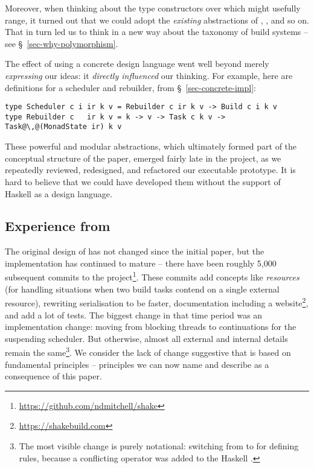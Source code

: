Moreover, when thinking about the type constructors over which  might
usefully range, it turned out that we could adopt the \emph{existing} abstractions
of , ,  and so on.
That in turn led us to think in a new way about the taxonomy
of build systems -- see \S~\ref{sec-why-polymorphism}.

The effect of using a concrete design language went well beyond
merely \emph{expressing} our ideas: it \emph{directly influenced}
our thinking.  For example, here are definitions for a scheduler and rebuilder,
from \S~\ref{sec-concrete-impl}:
\begin{verbatim}
type Scheduler c i ir k v = Rebuilder c ir k v -> Build c i k v
type Rebuilder c   ir k v = k -> v -> Task c k v -> Task@\,@(MonadState ir) k v
\end{verbatim}
These powerful and modular abstractions, which ultimately formed part
of the conceptual structure of the paper, emerged fairly late in the
project, as we repeatedly reviewed, redesigned, and refactored our
executable prototype.  It is hard to believe that we could have
developed them without the support of Haskell as a design language.

\subsection{Experience from \Shake}\label{sec-experience-shake}

The original design of \Shake has not changed since the initial paper, but the
implementation has continued to mature -- there have been roughly 5,000
subsequent commits to the \Shake
project\footnote{\url{https://github.com/ndmitchell/shake}}. These commits add
concepts like \emph{resources} (for handling situations when two build tasks
contend on a single external resource), rewriting serialisation to be faster,
documentation including a website\footnote{\url{https://shakebuild.com}}, and
add a lot of tests. The biggest change in that time period was an implementation
change: moving from
blocking threads to continuations for the suspending scheduler.
But otherwise, almost all external and internal details remain the same\footnote{
  The most visible change is purely notational: switching from \hs{*>} to 
  for defining rules, because a conflicting \hs{*>} operator was added to the
  Haskell .}.
We consider the lack of change suggestive that \Shake is based on fundamental
principles -- principles we can now name and describe as a consequence
of this paper.

